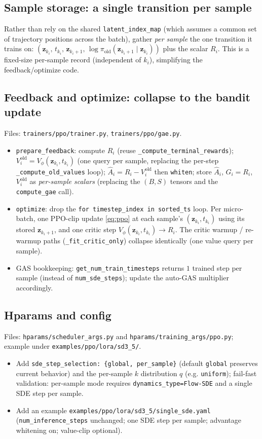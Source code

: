 \documentclass[11pt]{article}
\theoremstyle{plain}
\theoremstyle{remark}
\newcommand{\zt}{\bm{z}}
\newcommand{\Vphi}{V_\phi}
\begin{document}
\subsection{Sample storage: a single transition per sample}
Rather than rely on the shared \texttt{latent\_index\_map} (which assumes a common set of
trajectory positions across the batch), gather \emph{per sample} the one transition it
trains on: $(\zt_{k_i},\,t_{k_i},\,\zt_{k_i+1},\,\log\pi_{\mathrm{old}}(\zt_{k_i+1}\mid
\zt_{k_i}))$ plus the scalar $R_i$. This is a fixed-size per-sample record (independent
of $k_i$), simplifying the feedback/optimize code.

\subsection{Feedback and optimize: collapse to the bandit update}
Files: \texttt{trainers/ppo/trainer.py}, \texttt{trainers/ppo/gae.py}.
\begin{itemize}[leftmargin=1.5em]
  \item \texttt{prepare\_feedback}: compute $R_i$ (reuse
  \texttt{\_compute\_terminal\_rewards}); $V^{\text{old}}_i=\Vphi(\zt_{k_i},t_{k_i})$
  (one query per sample, replacing the per-step \texttt{\_compute\_old\_values} loop);
  $\hat A_i=R_i-V^{\text{old}}_i$ then \texttt{whiten}; store $\hat A_i$, $G_i=R_i$,
  $V^{\text{old}}_i$ as \emph{per-sample scalars} (replacing the $(B,S)$ tensors and the
  \texttt{compute\_gae} call).
  \item \texttt{optimize}: drop the \texttt{for timestep\_index in sorted\_ts} loop. Per
  micro-batch, one PPO-clip update \eqref{eq:ppo} at each sample's $(\zt_{k_i},t_{k_i})$
  using its stored $\zt_{k_i+1}$, and one critic step
  $\Vphi(\zt_{k_i},t_{k_i})\to R_i$. The critic warmup / re-warmup paths
  (\texttt{\_fit\_critic\_only}) collapse identically (one value query per sample).
  \item GAS bookkeeping: \texttt{get\_num\_train\_timesteps} returns $1$ trained step per
  sample (instead of \texttt{num\_sde\_steps}); update the auto-GAS multiplier accordingly.
\end{itemize}

\subsection{Hparams and config}
Files: \texttt{hparams/scheduler\_args.py} and \texttt{hparams/training\_args/ppo.py};
example under \texttt{examples/ppo/lora/sd3\_5/}.
\begin{itemize}[leftmargin=1.5em]
  \item Add \texttt{sde\_step\_selection: \{global, per\_sample\}} (default \texttt{global}
  preserves current behavior) and the per-sample $k$ distribution $q$ (e.g.
  \texttt{uniform}); fail-fast validation: per-sample mode requires
  \texttt{dynamics\_type=Flow-SDE} and a single SDE step per sample.
  \item Add an example \texttt{examples/ppo/lora/sd3\_5/single\_sde.yaml}
  (\texttt{num\_inference\_steps} unchanged; one SDE step per sample; advantage whitening
  on; value-clip optional).
\end{itemize}
\end{document}
